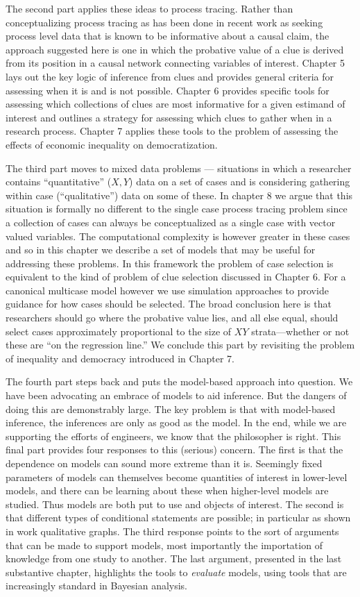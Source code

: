 \documentclass[12pt,]{book}
\begin{document}
The second part applies these ideas to process tracing. Rather than conceptualizing process tracing as has been done in recent work as seeking process level data that is known to be informative about a causal claim, the approach suggested here is one in which the probative value of a clue is derived from its position in a causal network connecting variables of interest. Chapter 5 lays out the key logic of inference from clues and provides general criteria for assessing when it is and is not possible. Chapter 6 provides specific tools for assessing which collections of clues are most informative for a given estimand of interest and outlines a strategy for assessing which clues to gather when in a research process. Chapter 7 applies these tools to the problem of assessing the effects of economic inequality on democratization.

The third part moves to mixed data problems --- situations in which a researcher contains ``quantitative'' (\(X,Y\)) data on a set of cases and is considering gathering within case (``qualitative'') data on some of these. In chapter 8 we argue that this situation is formally no different to the single case process tracing problem since a collection of cases can always be conceptualized as a single case with vector valued variables. The computational complexity is however greater in these cases and so in this chapter we describe a set of models that may be useful for addressing these problems. In this framework the problem of case selection is equivalent to the kind of problem of clue selection discussed in Chapter 6. For a canonical multicase model however we use simulation approaches to provide guidance for how cases should be selected. The broad conclusion here is that researchers should go where the probative value lies, and all else equal, should select cases approximately proportional to the size of \(XY\) strata---whether or not these are ``on the regression line.'' We conclude this part by revisiting the problem of inequality and democracy introduced in Chapter 7.

The fourth part steps back and puts the model-based approach into question. We have been advocating an embrace of models to aid inference. But the dangers of doing this are demonstrably large. The key problem is that with model-based inference, the inferences are only as good as the model. In the end, while we are supporting the efforts of engineers, we know that the philosopher is right. This final part provides four responses to this (serious) concern. The first is that the dependence on models can sound more extreme than it is. Seemingly fixed parameters of models can themselves become quantities of interest in lower-level models, and there can be learning about these when higher-level models are studied. Thus models are both put to use and objects of interest. The second is that different types of conditional statements are possible; in particular as shown in work qualitative graphs. The third response points to the sort of arguments that can be made to support models, most importantly the importation of knowledge from one study to another. The last argument, presented in the last substantive chapter, highlights the tools to \emph{evaluate} models, using tools that are increasingly standard in Bayesian analysis.
\end{document}
